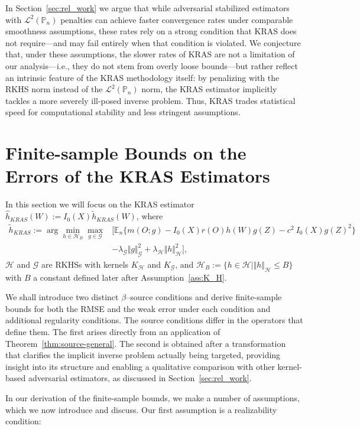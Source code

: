 \documentclass[twoside,11pt]{article}
\newcommand{\E}{\mathbb{E}}
\newcommand{\mc}{\mathcal}
\begin{document}
In Section~\ref{sec:rel_work} we argue that while adversarial stabilized estimators with $\mathcal{L}^2(\mathbb{P}_n)$ penalties can achieve faster convergence rates under comparable smoothness assumptions, these rates rely on a strong condition that KRAS does not require—and may fail entirely when that condition is violated. We conjecture that, under these assumptions, the slower rates of KRAS are not a limitation of our analysis—i.e., they do not stem from overly loose bounds—but rather reflect an intrinsic feature of the KRAS methodology itself: by penalizing with the RKHS norm instead of the $\mathcal{L}^2(\mathbb{P}_n)$ norm, the KRAS estimator implicitly tackles a more severely ill-posed inverse problem. Thus, KRAS trades statistical speed for computational stability and less stringent assumptions. 

\section{Finite-sample Bounds on the Errors of the KRAS Estimators}\label{sec:conv_analysis}

In this section we will focus on the KRAS estimator $\hat {h}_{KRAS}(W) :=I_0(X)\tilde {h}_{KRAS}(W)$, where
\begin{align}
\tilde {h}_{KRAS}:=\arg\min_{h\in\mc{H}_B}\max_{g\in\mc{G}}&\big[\E_n\{m(O;g)-I_0(X)r(O)h(W)g(Z)-c^2\: I_0(X)g(Z)^2\} \label{def:h_tilde}\\
&-\lambda_{\mc{G}}\Vert g\Vert^2_\mc{G}+\lambda_{\mc{H}}\Vert h\Vert^2_\mc{H}\big]\nonumber,
\end{align}
$\mc{H}$ and $\mc{G}$ are RKHSs with kernels $K_{\mc{H}}$ and $K_{\mc{G}}$, and $\mc{H}_B:=\{h\in\mc{H}\mid \Vert h\Vert_\mc{H}\le B\}$ with $B$ a constant defined later after Assumption~\ref{ass:K_H}. 

We shall introduce two distinct $\beta$--source conditions and derive finite-sample bounds for both the RMSE and the weak error under each condition and additional regularity conditions. The source conditions differ in the operators that define them. The first arises directly from an application of Theorem~\ref{thm:source-general}. The second is obtained after a transformation that clarifies the implicit inverse problem actually being targeted, providing insight into its structure and enabling a qualitative comparison with other kernel-based adversarial estimators, as discussed in Section~\ref{sec:rel_work}.

In our derivation of the finite-sample bounds, we make a number of assumptions, which we now introduce and discuss. Our first assumption is a realizability condition:
\end{document}
